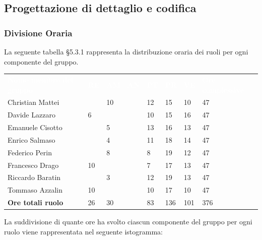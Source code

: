 \subsection{Progettazione di dettaglio e codifica}

\subsubsection{Divisione Oraria}
La seguente tabella §5.3.1 rappresenta la distribuzione oraria dei ruoli per ogni componente del gruppo.
{
	\renewcommand{\arraystretch}{2}
	\centering
	\begin{longtable}{ C{5cm} C{1cm} C{1cm} C{1cm} C{1cm} C{1cm} C{1cm} C{3cm}}
		\textcolor{white}{\textbf{Nome membro del gruppo}} & \textcolor{white}{\textbf{RE}} & \textcolor{white}{\textbf{AM}} & \textcolor{white}{\textbf{AN}} & \textcolor{white}{\textbf{PT}} & \textcolor{white}{\textbf{PR}} & \textcolor{white}{\textbf{VE}} & \textcolor{white}{\textbf{Ore complessive}}\\	
        
        Christian Mattei & & 10 & & 12 & 15 & 10 & 47\\
        Davide Lazzaro & 6 & & & 10 & 15 & 16 & 47\\
        Emanuele Cisotto & & 5 & & 13 & 16 & 13 & 47 \\
        Enrico Salmaso & & 4 & & 11 & 18 & 14 & 47\\
        Federico Perin & & 8 & & 8 & 19 & 12 & 47\\
        Francesco Drago & 10 & & & 7 & 17 & 13 & 47\\
        Riccardo Baratin & & 3 & & 12 & 19 & 13 & 47\\
        Tommaso Azzalin & 10 & & & 10 & 17 & 10 & 47 \\
        \textbf{Ore totali ruolo} & 26 & 30 & & 83 & 136 & 101 & 376\\
		
	\end{longtable}
}

La suddivisione di quante ore ha svolto ciascun componente del gruppo per ogni ruolo viene rappresentata nel seguente istogramma:

